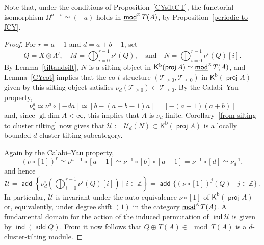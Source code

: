 \documentclass[a4paper,reqno,11pt]{amsart}
\newtheorem{proposition}[theorem]{Proposition}
\theoremstyle{definition}
\newcommand{\KKK}{\mathsf{K}}
\newcommand{\TT}{\mathcal{T}}
\newcommand{\UU}{\mathcal{U}}
\newcommand{\Z}{\mathbb{Z}}
\newcommand{\bo}{\operatorname{b}\nolimits}
\newcommand{\gl}{\operatorname{gl.\!dim}\nolimits}
\DeclareMathOperator{\proj}{\mathsf{proj}}
\DeclareMathOperator{\ind}{\mathsf{ind}}
\DeclareMathOperator{\add}{\mathsf{add}}
\newcommand{\stmod}{\mathop{\underline{\mod}}\nolimits}
\numberwithin{equation}{section}
\begin{document}
Note that, under the conditions of Proposition~\ref{CYsiltCT}, the functorial isomorphism $\Omega^{a+b}\simeq (-a)$ holds in $\stmod^{\Z}T(A)$, by Proposition~\ref{periodic to fCY}.


\begin{proof}
For $r = a-1$ and $d = a+b-1$, set
\[Q = X\otimes \Lambda',\quad
M = \bigoplus_{i=0}^{r-1}\nu^i(Q), \quad\mbox{and}\quad
N = \bigoplus_{i=0}^{r-1}\nu^i(Q)[i].\]
By Lemma~\ref{tiltandsilt}, $N$ is a silting object in $\KKK^{\bo}(\proj A)\simeq\stmod^{\Z}T(A)$, and Lemma~\ref{CYcot} implies that the co-$t$-structure $(\TT_{\ge0},\TT_{\le0})$ in $\KKK^{\bo}(\proj A)$ given by this silting object satisfies $\nu_d(\TT_{\ge0})\subset \TT_{\ge0}$.
%
By the Calabi--Yau property,
\[ \nu_d^{a}\simeq \nu^a\circ[-da]\simeq [b-(a+b-1)a] = [-(a-1)(a+b)] \]
and, since $\gl A<\infty$, this implies that $A$ is $\nu_d$-finite. 
Corollary~\ref{from silting to cluster tilting} now gives that $\UU:=\UU_d(N)\subset\KKK^{\bo}(\proj A)$ is a locally bounded $d$-cluster-tilting subcategory.

Again by the Calabi--Yau property,
\[(\nu\circ[1])^r \simeq \nu^{a-1}\circ[a-1] \simeq \nu^{-1}\circ[b]\circ[a-1] = \nu^{-1}\circ[d] \simeq \nu_d^{-1},\]
and hence
\[\textstyle \UU = \add\left\{\nu_d^i\left(\bigoplus_{i=0}^{r-1}\nu^i(Q)[i]\right) \mid i\in\Z\right\} = \add\{(\nu\circ[1])^j(Q) \mid j\in\Z \} \,.\]
In particular, $\UU$ is invariant under the auto-equivalence $\nu\circ[1]$ of $\KKK^{\bo}(\proj A)$ or, equivalently, under degree shift $(1)$ in the category $\stmod^{\Z} T(A)$.
A fundamental domain for the action of the induced permutation of $\ind\UU$ is given by $\ind(\add Q)$.
From \cite[Theorem~2.3]{DI} it now follows that $Q\oplus T(A)\in\mod T(A)$ is a $d$-cluster-tilting module.

\end{proof}
\end{document}
